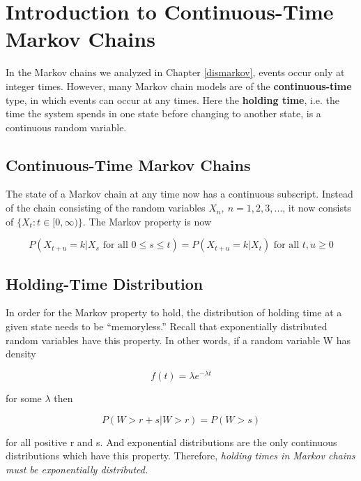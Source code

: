 \chapter{Introduction to Continuous-Time Markov Chains}
\label{conmarkov} 

In the Markov chains we analyzed in Chapter \ref{dismarkov}, events
occur only at integer times.  However, many Markov chain models are of
the \textbf{continuous-time} type, in which events can occur at any
times.  Here the \textbf{holding time}, i.e. the time the system spends
in one state before changing to another state, is a continuous random
variable.

\section{Continuous-Time Markov Chains}

The state of a Markov chain at any time now has a continuous subscript.
Instead of the chain consisting of the random variables $X_n, ~ n =
1,2,3,...$, it now consists of $\{X_t: t \in [0,\infty)\}$.  The Markov
property is now

\begin{equation}
P(X_{t+u} = k | X_s \textrm{ for all } 0 \leq s \leq t) =
P(X_{t+u} = k | X_t) \textrm{ for all } t,u \geq 0
\end{equation}

\section{Holding-Time Distribution}

In order for the Markov property to hold, the distribution of holding
time at a given state needs to be ``memoryless.'' Recall that
exponentially distributed random variables have this property. In other
words, if a random variable W has density

\begin{equation}
\label{lambdaeqnxxx}
f(t)=\lambda e^{-\lambda t}
\end{equation}

for some $\lambda$ then

\begin{equation}
\label{exponnomemxxx}
P(W>r+s|W>r)=P(W>s)
\end{equation}

for all positive r and s. And exponential
distributions are the only continuous distributions which have this
property. Therefore, \textsl{holding times in Markov chains must be
exponentially distributed.}  


